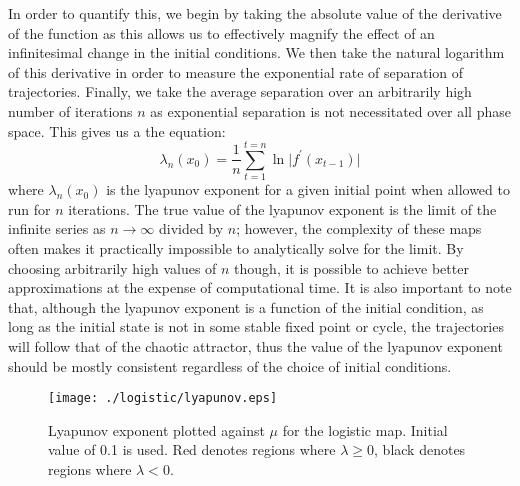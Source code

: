 In order to quantify this, we begin by taking the absolute value of the derivative of the function as this allows us to effectively magnify the effect of an infinitesimal change in the initial conditions. We then take the natural logarithm of this derivative in order to measure the exponential rate of separation of trajectories. Finally, we take the average separation over an arbitrarily high number of iterations $n$ as exponential separation is not necessitated over all phase space. This gives us a the equation:
\begin{equation}
    \lambda_n(x_0)=\frac{1}{n}\sum^{t=n}_{t=1}\ln\lvert f^\prime(x_{t-1})\rvert
\end{equation}
where $\lambda_n(x_0)$ is the lyapunov exponent for a given initial point when allowed to run for $n$ iterations. The true value of the lyapunov exponent is the limit of the infinite series as $n\rightarrow\infty$ divided by $n$; however, the complexity of these maps often makes it practically impossible to analytically solve for the limit. By choosing arbitrarily high values of $n$ though, it is possible to achieve better approximations at the expense of computational time. It is also important to note that, although the lyapunov exponent is a function of the initial condition, as long as the initial state is not in some stable fixed point or cycle, the trajectories will follow that of the chaotic attractor, thus the value of the lyapunov exponent should be mostly consistent regardless of the choice of initial conditions.
\begin{figure}
    \centering
    \texttt{[image: ./logistic/lyapunov.eps]}
    \caption{Lyapunov exponent plotted against $\mu$ for the logistic map. Initial value of 0.1 is used. Red denotes regions where $\lambda\geq0$, black denotes regions where $\lambda<0$.}
    \label{log_lyapunov}
\end{figure}

